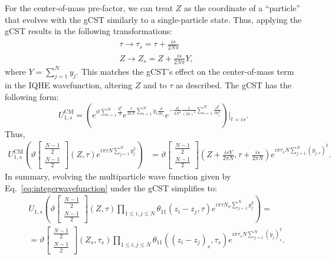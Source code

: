 \documentclass[a4paper,11pt]{article}
\begin{document}
For the center-of-mass pre-factor, we can treat $Z$ as the coordinate of a ``particle'' that evolves with the gCST similarly to a single-particle state. Thus, applying the gCST results in the following transformations:
\begin{align}
&\tau\rightarrow\tau_{s} = \tau + \frac{is}{2N\pi}\nonumber\\
&Z\rightarrow Z_{s} = Z+\frac{is}{2N\pi}Y,
\label{alterarionZ}
\end{align}
where $Y=\sum_{j=1}^{N}y_j$. This matches the gCST’s effect on the center-of-mass term in the IQHE wavefunction, altering $Z$ and to $\tau$ as described. The gCST has the following form:
\begin{equation*}
U^{\mathrm{CM}}_{1,s} = \left(e^{it\sum_{i=1}^{N}\frac{y_{i}^{2}}{2}}e^{\frac{t}{2\pi N}\sum_{i=1}^{N}y_{i}\frac{\partial}{\partial x_{i}}}e^{-\frac{it}{2N^{2}}\frac{1}{(2\pi)^2}\sum_{i=1}^{N}\frac{\partial^2}{\partial x_{i}^2}}\right)\bigg|_{t=is}.     
\end{equation*}
Thus,
\begin{align*}
U^{\mathrm{CM}}_{1,s}\left(\vartheta\begin{bmatrix}
\frac{N-1}{2}\\
\frac{N-1}{2}
\end{bmatrix}(Z,\tau)e^{i\pi \tau N\sum_{j=1}^{N}y^2_j}\right) 
&= \vartheta\begin{bmatrix}
\frac{N-1}{2}\\
\frac{N-1}{2}
\end{bmatrix}\left(Z+\frac{isY}{2\pi N},\tau+\frac{is}{2\pi N}\right)e^{i\pi \tau_{s} N\sum_{j=1}^{N}(y_{j,s})^2}.
\end{align*}
In summary, evolving the multiparticle wave function given by Eq.~\eqref{eq:integerwavefunction} under the gCST simplifies to:
\begin{align}
&U_{1,s}\left(\vartheta\begin{bmatrix}
\frac{N-1}{2}\\
\frac{N-1}{2}
\end{bmatrix}(Z,\tau)\prod_{1\leq i,j\leq N}\theta_{11}(z_{i}-z_{j},\tau)e^{i\pi\tau N_{\phi}\sum_{j=1}^{N}y_{j}^{2}}\right) =  \nonumber\\
&=\vartheta\begin{bmatrix}
\frac{N-1}{2}\\
\frac{N-1}{2}
\end{bmatrix}(Z_{s},\tau_{s})\prod_{1\leq i,j\leq N}\theta_{11}((z_{i}-z_{j})_{s},\tau_s)e^{i\pi\tau_{s} N\sum_{j=1}^{N}(y_{j})_{s}^{2}}.   
\label{eq:evolutionintegerwihouthalfform}
\end{align}
\end{document}

